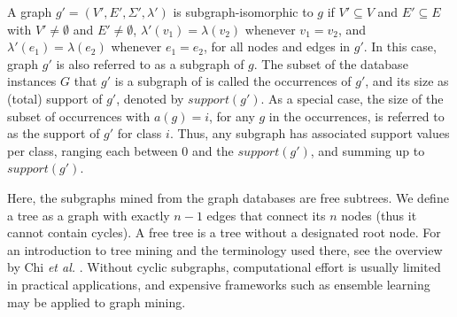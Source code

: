 \documentclass{sig-alternate}
\begin{document}
A graph $g'=(V',E',\Sigma',\lambda')$ is subgraph-isomorphic to $g$ if $V'
\subseteq V$ and $E' \subseteq E$ with $V' \ne \emptyset$ and $E' \ne
\emptyset$, $\lambda'(v_1)=\lambda(v_2)$ whenever $v_1=v_2$, and
$\lambda'(e_1)=\lambda(e_2)$ whenever $e_1=e_2$, for all nodes and edges in
$g'$. In this case, graph $g'$ is also referred to as a subgraph of $g$. The subset of 
the database instances $G$ that $g'$ is a subgraph of is called the occurrences of $g'$, 
and its size as (total) support of
$g'$, denoted by $support(g')$. As a special case, the size of the subset of occurrences with $a(g)=i$,
for any $g$ in the occurrences, is referred to as the support of $g'$ for class
$i$. Thus, any subgraph has associated support values per class, ranging each
between 0 and the $support(g')$, and summing up to $support(g')$.

Here, the subgraphs mined from the graph databases are free subtrees. We define a tree
as a graph with exactly $n-1$ edges that connect its $n$ nodes (thus it cannot contain cycles). A free tree is
a tree without a designated root node. For an introduction to tree mining and
the terminology used there, see the overview by Chi \emph{et al.}
\cite{CMNK01Frequent}.
Without cyclic subgraphs, computational effort is usually limited in practical applications, and expensive frameworks such as ensemble learning may be applied to graph mining. 
\end{document}
